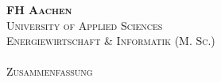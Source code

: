

\begin{titlepage}
  
  \thispagestyle{empty}
  
  \makebox[0pt][l]{
    \begin{picture}(50,50)
      \put(543, -155){
        \hfill
        \texttt{[image: ./images/fh-logo-right.pdf]} %
      }
    \end{picture}
  }

  \begin{center}
    {\Large \textsc{\textbf{FH Aachen}}}\\[0.2cm]
    {\large \textsc{University of Applied Sciences}}\\
    {\large \textsc{Energiewirtschaft \& Informatik (M. Sc.)}}\\[1cm]

    {\Huge \textsc{\textbf{\modulname}}}\\[0.2cm]
    {\Large \textsc{Zusammenfassung}}\\[0.2cm]
    {\textsc{\semester}}\\
  \end{center}


  \vspace{2cm}
  

  \noindent{}

  \end{titlepage}
 
